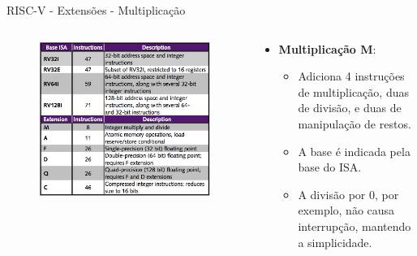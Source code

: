 \documentclass[aspectratio=169]{beamer}
\begin{document}
\begin{frame}{RISC-V - Extensões - Multiplicação}
	\begin{columns}
		\begin{column}{0.58\textwidth}
			\begin{figure}
				\centering
				\label{fig:bi2}
				\includegraphics[width=1\textwidth]{img/base-instruction.png}
			\end{figure}
		\end{column}
		\begin{column}{0.55\textwidth}
			\begin{itemize}
				\item \textbf{Multiplicação M}:
				\begin{itemize}
					\item Adiciona 4 instruções de multiplicação, duas de divisão, e duas de manipulação de restos.
					\item A base é indicada pela base do ISA.
					\item A divisão por 0, por exemplo, não causa interrupção, mantendo a simplicidade.
				\end{itemize}
			\end{itemize}
		\end{column}
	\end{columns}
\end{frame}
\end{document}
